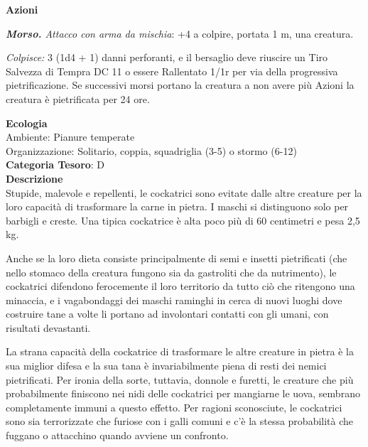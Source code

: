 \begin{multicols}{2}
{\textbf{Azioni}

\emph{\textbf{Morso.} Attacco con arma da mischia}: +4 a colpire, portata 1 m, una creatura.

\emph{Colpisce:} 3 (1d4 + 1) danni perforanti, e il bersaglio deve riuscire un Tiro Salvezza di Tempra DC 11 o essere Rallentato 1/1r per via della progressiva pietrificazione. Se successivi morsi portano la creatura a non avere più Azioni la creatura è pietrificata per 24 ore.

\textbf{Ecologia}\\
Ambiente: Pianure temperate\\
Organizzazione: Solitario, coppia, squadriglia (3-5) o stormo (6-12)\\
\textbf{Categoria Tesoro}: D\\
\textbf{Descrizione}\\
Stupide, malevole e repellenti, le cockatrici sono evitate dalle altre creature per la loro capacità di trasformare la carne in pietra. I maschi si distinguono solo per barbigli e creste. Una tipica cockatrice è alta poco più di 60 centimetri e pesa 2,5 kg.

Anche se la loro dieta consiste principalmente di semi e insetti pietrificati (che nello stomaco della creatura fungono sia da gastroliti che da nutrimento), le cockatrici difendono ferocemente il loro territorio da tutto ciò che ritengono una minaccia, e i vagabondaggi dei maschi raminghi in cerca di nuovi luoghi dove costruire tane a volte li portano ad involontari contatti con gli umani, con risultati devastanti.

La strana capacità della cockatrice di trasformare le altre creature in pietra è la sua miglior difesa e la sua tana è invariabilmente piena di resti dei nemici pietrificati. Per ironia della sorte, tuttavia, donnole e furetti, le creature che più probabilmente finiscono nei nidi delle cockatrici per mangiarne le uova, sembrano completamente immuni a questo effetto. Per ragioni sconosciute, le cockatrici sono sia terrorizzate che furiose con i galli comuni e c'è la stessa probabilità che fuggano o attacchino quando avviene un confronto.

}
\end{multicols}
